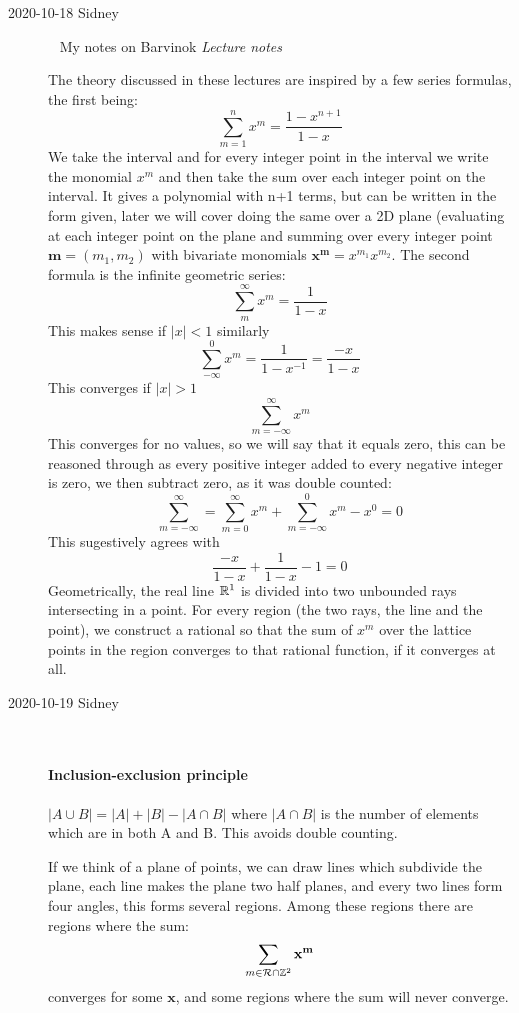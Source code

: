 \begin{description}
\item[2020-10-18 Sidney]~
My notes on Barvinok
{{\em Lecture notes}}

The theory discussed in these lectures are inspired by a few series formulas, the first being:
$$\sum^n_{m=1}x^m=\frac{1-x^{n+1}}{1-x}$$
We take the interval \PCedit{$[0,n)$} and for every integer point
in the interval we write the monomial $x^m$ and then take the sum over
each integer point on the interval. It gives a polynomial with n+1 terms,
but can be written in the form given, later we will cover doing the same
over a 2D plane (evaluating at each integer point on the plane and
summing over every integer point $\mathbf{m}=(m_1,m_2)$ with bivariate
monomials $\mathbf{x}^\mathbf{m}=x^{m_1}x^{m_2}$. The second formula is the
infinite geometric series:
$$\sum^{\infty}_{m}x^m=\frac{1}{1-x}$$
This makes sense if $|x|<1$ similarly
$$\sum^0_{-\infty}x^m=\frac{1}{1-x^{-1}}=\frac{-x}{1-x}$$
This converges if $|x|>1$
$$\sum^{\infty}_{m=-\infty}x^m$$
This converges for no values, so we will say that it equals zero, this can be reasoned through as every positive integer added to every negative integer is zero, we then subtract zero, as it was double counted:
$$\sum^{\infty}_{m=-\infty}=\sum^{\infty}_{m=0}x^m+\sum^{0}_{m=-\infty}x^m-x^0=0$$
This sugestively agrees with
$$\frac{-x}{1-x}+\frac{1}{1-x}-1=0$$
Geometrically, the real line $\mathbb{R}^1$ is divided into two unbounded rays intersecting in a point. For every region (the two rays, the line and the point), we construct a rational so that the sum of $x^m$ over the lattice points in the region converges to that rational function, if it converges at all.

\item[2020-10-19 Sidney]~~

\paragraph{Inclusion-exclusion principle}
$|A\cup B|=|A|+|B|-|A\cap B|$ where $|A\cap B|$ is the number of elements
which are in both A and B. This avoids double counting.

If we think of a plane of points, we can draw lines which subdivide the
plane, each line makes the plane two half planes, and every two lines
form four angles, this forms several regions. Among these regions there
are regions {\R} where the sum:
$$\sum_{m\in {\ensuremath{\mathcal{R}}}\cap \mathbb{Z}^2}\mathbf{x}^\mathbf{m}$$
converges for some $\mathbf{x}$, and some regions where the sum will
never converge.


\end{description}
